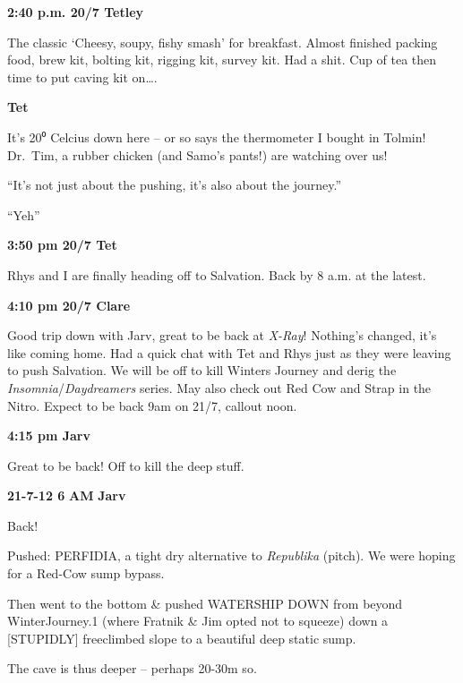 \textbf{2:40 p.m. 20/7 Tetley}

The classic `Cheesy, soupy, fishy smash' for breakfast. Almost finished
packing food, brew kit, bolting kit, rigging kit, survey kit. Had a
shit. Cup of tea then time to put caving kit on\ldots{}.

\textbf{Tet}

It's 20⁰ Celcius down here -- or so says the thermometer I bought in
Tolmin! Dr.~Tim, a rubber chicken (and Samo's pants!) are watching over
us!

``It's not just about the pushing, it's also about the journey.''

``Yeh''

\textbf{3:50 pm 20/7 Tet}

Rhys and I are finally heading off to Salvation. Back by 8 a.m. at the
latest.

\textbf{4:10 pm 20/7 Clare}

Good trip down with Jarv, great to be back at \emph{X-Ray}! Nothing's
changed, it's like coming home. Had a quick chat with Tet and Rhys just
as they were leaving to push Salvation. We will be off to kill Winters
Journey and derig the \emph{Insomnia}/\emph{Daydreamers} series. May
also check out Red Cow and Strap in the Nitro. Expect to be back 9am on
21/7, callout noon.

\textbf{4:15 pm Jarv}

Great to be back! Off to kill the deep stuff.

\textbf{21-7-12 6} \textbf{AM} \textbf{Jarv}

Back!

Pushed: PERFIDIA, a tight dry alternative to \emph{Republika} (pitch).
We were hoping for a Red-Cow sump bypass.

Then went to the bottom \& pushed WATERSHIP DOWN from beyond
WinterJourney.1 (where Fratnik \& Jim opted not to squeeze) down a
{[}STUPIDLY{]} freeclimbed slope to a beautiful deep static sump.

The cave is thus deeper -- perhaps 20-30m so.

